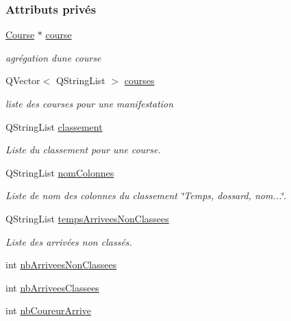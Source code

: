 \subsubsection*{Attributs privés}
\begin{DoxyCompactItemize}
\item 
\hyperlink{class_course}{Course} $\ast$ \hyperlink{class_i_h_m_chrono_cross_a03a8226c0e7f423d29302d9a06284ab4}{course}
\begin{DoxyCompactList}\small\item\em agrégation d\textquotesingle{}une course \end{DoxyCompactList}\item 
Q\+Vector$<$ Q\+String\+List $>$ \hyperlink{class_i_h_m_chrono_cross_a646f70038327c068a2f7c7be6e07d2ee}{courses}
\begin{DoxyCompactList}\small\item\em liste des courses pour une manifestation \end{DoxyCompactList}\item 
Q\+String\+List \hyperlink{class_i_h_m_chrono_cross_a49236628e14e516e1ab7a181eac8fea8}{classement}
\begin{DoxyCompactList}\small\item\em Liste du classement pour une course. \end{DoxyCompactList}\item 
Q\+String\+List \hyperlink{class_i_h_m_chrono_cross_a21f1b0ba82ff1b4a7b842b5f3c411e60}{nom\+Colonnes}
\begin{DoxyCompactList}\small\item\em Liste de nom des colonnes du classement \char`\"{}\+Temps, dossard, nom...\char`\"{}. \end{DoxyCompactList}\item 
Q\+String\+List \hyperlink{class_i_h_m_chrono_cross_a9d0542a5334cd284d1ea9cf732cb013e}{temps\+Arrivees\+Non\+Classees}
\begin{DoxyCompactList}\small\item\em Liste des arrivées non classés. \end{DoxyCompactList}\item 
int \hyperlink{class_i_h_m_chrono_cross_aa3198d36b0574b477a328621c8e1e0f0}{nb\+Arrivees\+Non\+Classees}
\item 
int \hyperlink{class_i_h_m_chrono_cross_a9bdcd0e57b79f64957eefea0f9d2b097}{nb\+Arrivees\+Classees}
\item 
int \hyperlink{class_i_h_m_chrono_cross_aba349505e99e6e320b218ba2b7fb485e}{nb\+Coureur\+Arrive}

\end{DoxyCompactItemize}
